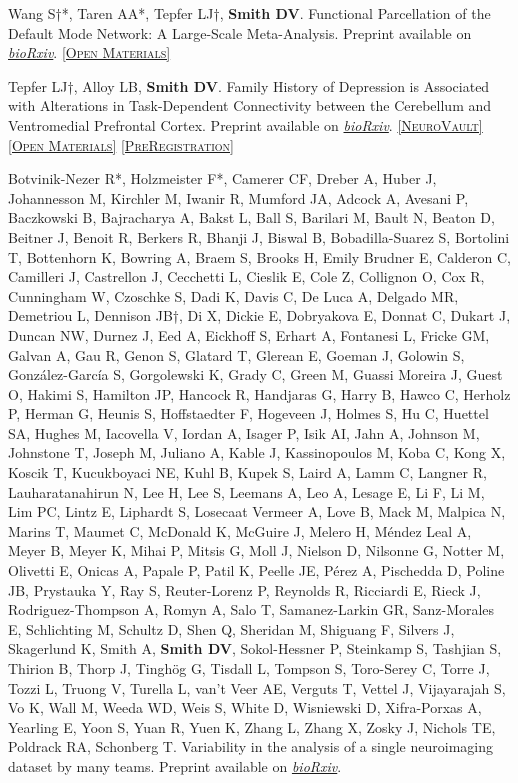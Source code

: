 \documentclass[11pt, letterpaper]{article}
\newcommand{\biorxiv}[1]{\href{#1}{\textit{bioRxiv}}}
\newcommand{\neurovault}[1]{\href{#1}{\scriptsize\textsc{[NeuroVault]}}}
\newcommand{\materials}[1]{\href{#1}{\scriptsize\textsc{[Open Materials]}}}
\newcommand{\preregistration}[1]{\href{#1}{\scriptsize\textsc{[PreRegistration]}}}
\begin{document}
\begin{hangparas}{.5in}{1}

Wang S†*, Taren AA*, Tepfer LJ†, \textbf{Smith DV}. Functional Parcellation of the Default Mode Network: A Large-Scale Meta-Analysis. Preprint available on \biorxiv{https://www.biorxiv.org/content/10.1101/225375v3}. \materials{https://zenodo.org/record/3599989\#.Xl2u4y2ZPOQ}

Tepfer LJ†, Alloy LB, \textbf{Smith DV}. Family History of Depression is Associated with Alterations in Task-Dependent Connectivity between the Cerebellum and Ventromedial Prefrontal Cortex. Preprint available on \biorxiv{https://www.biorxiv.org/content/10.1101/851477v1.abstract}. \neurovault{https://neurovault.org/collections/6130/} \materials{https://osf.io/ju32v/} \preregistration{http://aspredicted.org/blind.php?x=8qw2h3}

Botvinik-Nezer R*, Holzmeister F*, Camerer CF, Dreber A, Huber J, Johannesson M, Kirchler M, Iwanir R, Mumford JA, Adcock A, Avesani P, Baczkowski B, Bajracharya A, Bakst L, Ball S, Barilari M, Bault N, Beaton D, Beitner J, Benoit R, Berkers R, Bhanji J, Biswal B, Bobadilla-Suarez S, Bortolini T, Bottenhorn K, Bowring A, Braem S, Brooks H, Emily Brudner E, Calderon C, Camilleri J, Castrellon J, Cecchetti L, Cieslik E, Cole Z, Collignon O, Cox R, Cunningham W, Czoschke S, Dadi K, Davis C, De Luca A, Delgado MR, Demetriou L, Dennison JB†, Di X, Dickie E, Dobryakova E, Donnat C, Dukart J, Duncan NW, Durnez J, Eed A, Eickhoff S, Erhart A, Fontanesi L, Fricke GM, Galvan A, Gau R, Genon S, Glatard T, Glerean E, Goeman J,  Golowin S, González-García S, Gorgolewski K, Grady C, Green M, Guassi Moreira J, Guest O, Hakimi S, Hamilton JP, Hancock R, Handjaras G, Harry B, Hawco C, Herholz P, Herman G, Heunis S, Hoffstaedter F, Hogeveen J, Holmes S, Hu C, Huettel SA, Hughes M, Iacovella V, Iordan A, Isager P, Isik AI, Jahn A, Johnson M, Johnstone T, Joseph M, Juliano A, Kable J, Kassinopoulos M, Koba C, Kong X, Koscik T, Kucukboyaci NE, Kuhl B, Kupek S, Laird A, Lamm C, Langner R, Lauharatanahirun N, Lee H, Lee S, Leemans A, Leo A, Lesage E, Li F, Li M, Lim PC, Lintz E, Liphardt S, Losecaat Vermeer A, Love B, Mack M, Malpica N, Marins T, Maumet C, McDonald K, McGuire J, Melero H, Méndez Leal A, Meyer B, Meyer K, Mihai P, Mitsis G, Moll J, Nielson D, Nilsonne G, Notter M, Olivetti E, Onicas A, Papale P, Patil K, Peelle JE, Pérez A, Pischedda D, Poline JB, Prystauka Y, Ray S, Reuter-Lorenz P, Reynolds R, Ricciardi E, Rieck J, Rodriguez-Thompson A, Romyn A, Salo T, Samanez-Larkin GR, Sanz-Morales E, Schlichting M, Schultz D, Shen Q, Sheridan M, Shiguang F, Silvers J, Skagerlund K, Smith A, \textbf{Smith DV}, Sokol-Hessner P, Steinkamp S, Tashjian S, Thirion B, Thorp J, Tinghög G, Tisdall L, Tompson S, Toro-Serey C, Torre J, Tozzi L, Truong V, Turella L, van’t Veer AE, Verguts T, Vettel J, Vijayarajah S, Vo K, Wall M, Weeda WD, Weis S, White D, Wisniewski D, Xifra-Porxas A, Yearling E, Yoon S, Yuan R, Yuen K, Zhang L, Zhang X, Zosky J, Nichols TE, Poldrack RA, Schonberg T. Variability in the analysis of a single neuroimaging dataset by many teams. Preprint available on \biorxiv{https://www.biorxiv.org/content/10.1101/843193v1}.


\end{hangparas}
\end{document}
